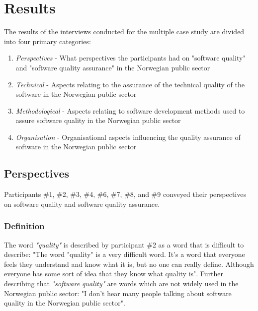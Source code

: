 \chapter{Results} \label{sec:results}
The results of the interviews conducted for the multiple case study are divided into four primary categories:

\begin{enumerate}
    \item \textit{Perspectives} - What perspectives the participants had on "software quality" and "software quality assurance" in the Norwegian public sector
    \item \textit{Technical} - Aspects relating to the assurance of the technical quality of the software in the Norwegian public sector 
    \item \textit{Methodological} - Aspects relating to software development methods used to assure software quality in the Norwegian public sector
    \item \textit{Organisation} - Organisational aspects influencing the quality assurance of software in the Norwegian public sector
\end{enumerate}

\section{Perspectives} \label{sec:perspectives}
Participants \#1, \#2, \#3, \#4, \#6, \#7, \#8, and \#9 conveyed their perspectives on software quality and software quality assurance.

\subsection{Definition} \label{sec:definition}
The word \textit{"quality"} is described by participant \#2 as a word that is difficult to describe: "The word "quality" is a very difficult word. It's a word that everyone feels they understand and know what it is, but no one can really define. Although everyone has some sort of idea that they know what quality is". Further describing that \textit{"software quality"} are words which are not widely used in the Norwegian public sector: "I don't hear many people talking about software quality in the Norwegian public sector".


